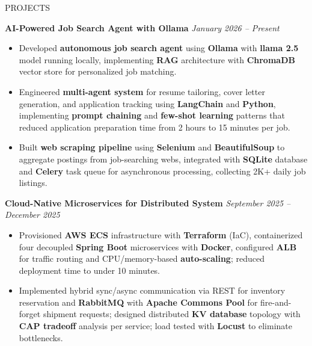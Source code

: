 \begin{rSection}{PROJECTS}
    \setlength{\parskip}{1pt}
    \setlength{\baselineskip}{1pt}

    \textbf{AI-Powered Job Search Agent with Ollama} \hfill \textit{January 2026 – Present}
    \vspace{-3pt}
\begin{itemize}
    \item Developed \textbf{autonomous job search agent} using \textbf{Ollama} with \textbf{llama 2.5} model running locally, implementing \textbf{RAG} architecture with \textbf{ChromaDB} vector store for personalized job matching.
    
    \item Engineered \textbf{multi-agent system}  for resume tailoring, cover letter generation, and application tracking using \textbf{LangChain} and \textbf{Python}, implementing \textbf{prompt chaining} and \textbf{few-shot learning} patterns that reduced application preparation time from 2 hours to 15 minutes per job.
    
    \item Built \textbf{web scraping pipeline} using \textbf{Selenium} and \textbf{BeautifulSoup} to aggregate postings from job-searching webs, integrated with \textbf{SQLite} database and \textbf{Celery} task queue for asynchronous processing, collecting 2K+ daily job listings.
    
 
\end{itemize}
\textbf{Cloud-Native Microservices for Distributed System} \hfill \textit{September 2025 – December 2025}
\begin{itemize}
    \item Provisioned \textbf{AWS ECS} infrastructure with \textbf{Terraform} (IaC), containerized four decoupled \textbf{Spring Boot} microservices with \textbf{Docker}, configured \textbf{ALB} for traffic routing and CPU/memory-based \textbf{auto-scaling}; reduced deployment time to under 10 minutes.

    \item Implemented hybrid sync/async communication via REST for inventory reservation and \textbf{RabbitMQ} with \textbf{Apache Commons Pool} for fire-and-forget shipment requests; designed distributed \textbf{KV database} topology with \textbf{CAP tradeoff} analysis per service; load tested with \textbf{Locust} to eliminate bottlenecks.
\end{itemize}





\end{rSection}
